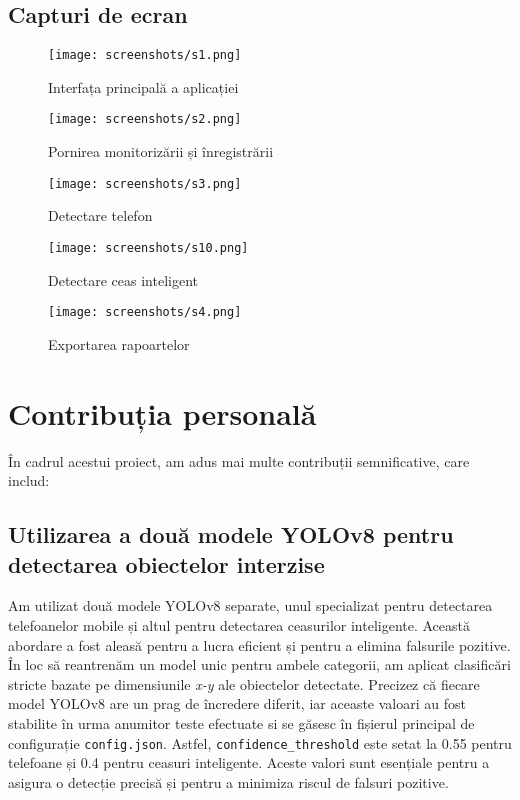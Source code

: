 \documentclass[12pt,a4paper]{article}
\begin{document}
\subsection{Capturi de ecran}

\begin{figure}[H]
    \centering
    \texttt{[image: screenshots/s1.png]}
    \caption{Interfața principală a aplicației}
\end{figure}

\begin{figure}[H]
    \centering
    \texttt{[image: screenshots/s2.png]}
    \caption{Pornirea monitorizării și înregistrării}
\end{figure}

\begin{figure}[H]
    \centering
    \texttt{[image: screenshots/s3.png]}
    \caption{Detectare telefon}
\end{figure}

\begin{figure}[H]
    \centering
    \texttt{[image: screenshots/s10.png]}
    \caption{Detectare ceas inteligent}
\end{figure}

\begin{figure}[H]
    \centering
    \texttt{[image: screenshots/s4.png]}
    \caption{Exportarea rapoartelor}
\end{figure}

\section{Contribuția personală}

În cadrul acestui proiect, am adus mai multe contribuții semnificative, care includ:

\subsection{Utilizarea a două modele YOLOv8 pentru detectarea obiectelor interzise}
Am utilizat două modele YOLOv8 separate, unul specializat pentru detectarea telefoanelor mobile și altul pentru detectarea ceasurilor inteligente. Această abordare a fost aleasă pentru a lucra eficient și pentru a elimina falsurile pozitive. În loc să reantrenăm un model unic pentru ambele categorii, am aplicat clasificări stricte bazate pe dimensiunile \textit{x-y} ale obiectelor detectate. Precizez că fiecare model YOLOv8 are un prag de încredere diferit, iar aceaste valoari au fost stabilite în urma anumitor teste efectuate si se găsesc în fișierul principal de configurație \texttt{config.json}. Astfel, \texttt{confidence\_threshold} este setat la 0.55 pentru telefoane și 0.4 pentru ceasuri inteligente. Aceste valori sunt esențiale pentru a asigura o detecție precisă și pentru a minimiza riscul de falsuri pozitive.
\end{document}
